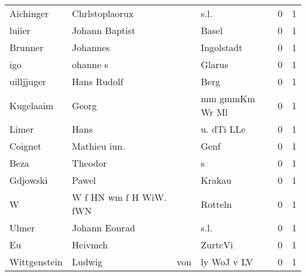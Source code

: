 \begin{tabular}{llllrr}
                Aichinger &                     Chrlstoplaorux &             &                                        s.l. &          0 &         1 \\
                   luiier &                     Johann Baptist &             &                                       Basel &          0 &         1 \\
                  Brunner &                           Johannes &             &                                  Ingolstadt &          0 &         1 \\
                      igo &                           ohanne s &             &                                      Glarus &          0 &         1 \\
               uilljjuger &                        Hans Rudolf &             &                                        Berg &          0 &         1 \\
                Kugelaaim &                              Georg &             &                              mm gmmKm Wr Ml &          0 &         1 \\
                    Limer &                               Hans &             &                                  u. dTi LLe &          0 &         1 \\
                  Coignet &                       Mathieu iun. &             &                                        Genf &          0 &         1 \\
                     Beza &                            Theodor &             &                                           s &          0 &         1 \\
                 Gdjowski &                              Pawel &             &                                      Krakau &          0 &         1 \\
                        W &             W f HN wm f H WiW. fWN &             &                                     Rotteln &          0 &         1 \\
                    Ulmer &                      Johann Eonrad &             &                                        s.l. &          0 &         1 \\
                       Eu &                            Heivmch &             &                                     ZurtcVi &          0 &         1 \\
             Wittgenstein &                             Ludwig &         von &                                 ly WoJ v LV &          0 &         1 \\

\end{tabular}
